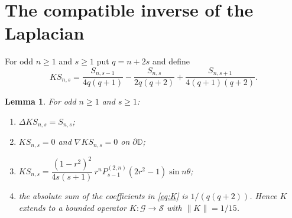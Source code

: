 \documentclass[11pt]{amsart}
\newtheorem{lemma}[theorem]{Lemma}
\theoremstyle{definition}
\theoremstyle{remark}
\numberwithin{equation}{section}
\newcommand{\D}{\mathbb{D}}
\newcommand{\Sc}{\mathcal{S}}
\newcommand{\Gc}{\mathcal{G}}
\newcommand{\nrm}[1]{\lVert #1\rVert}
\begin{document}
\section{The compatible inverse of the Laplacian}\label{sec:K}

For odd $n\geq1$ and $s\geq1$ put $q=n+2s$ and define
\begin{equation}\label{eq:K}
KS_{n,s}=\frac{S_{n,s-1}}{4q(q+1)}-\frac{S_{n,s}}{2q(q+2)}+\frac{S_{n,s+1}}{4(q+1)(q+2)} .
\end{equation}

\begin{lemma}\label{lem:K}
For odd $n\geq1$ and $s\geq1$:
\begin{enumerate}[label=\textup{(\alph*)}]
\item $\Delta KS_{n,s}=S_{n,s}$;
\item $KS_{n,s}=0$ and $\nabla KS_{n,s}=0$ on $\partial\D$;
\item $KS_{n,s}=\dfrac{(1-r^2)^2}{4s(s+1)}\,r^nP_{s-1}^{(2,n)}(2r^2-1)\sin n\theta$;
\item the absolute sum of the coefficients in \eqref{eq:K} is $1/(q(q+2))$. Hence $K$ extends to a bounded operator $K\colon\Gc\to\Sc$ with $\nrm K=1/15$.
\end{enumerate}
\end{lemma}
\end{document}
